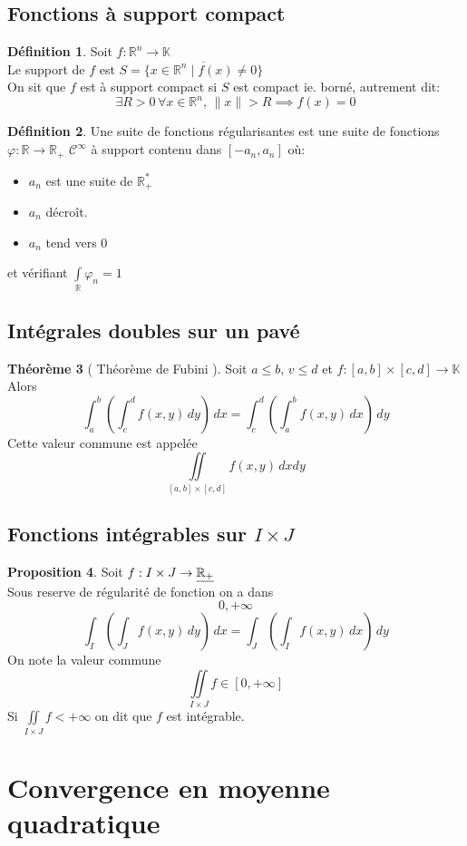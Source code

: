 \documentclass[10pt,a4paper]{article}
\theoremstyle{definition}
\newtheorem{proposition}{Proposition}[section]
\newtheorem{theorem}[proposition]{Théorème}
\newtheorem{definition}[proposition]{Définition}
\begin{document}
\subsection{Fonctions à support compact}
\begin{definition}
    Soit \(f: \mathbb{R}^n \to \mathbb{K}\) \\
    Le support de \(f\) est \(S = \overline{\{ x \in \mathbb{R}^n \mid f(x) \neq 0\}}\) \\
    On sit que \(f\) est à support compact si \(S\) est compact ie. borné, autrement dit:
    \[\exists R > 0 \, \forall x \in \mathbb{R}^n,\, \lVert x\rVert > R \implies f(x) = 0\]
\end{definition}
\begin{definition}
    Une suite de fonctions régularisantes est une suite de fonctions \\
    \(\varphi: \mathbb{R} \to \mathbb{R}_+\) \(\mathcal{C}^{\infty}\) à support contenu dans \([-a_n, a_n]\) où:
    \begin{itemize}
        \item \(a_n\) est une suite de \(\mathbb{R}_+^*\)
        \item \(a_n\) décroît.
        \item \(a_n\) tend vers \(0\)
    \end{itemize}
    et vérifiant \(\int\limits_{\mathbb{R}} \varphi_n = 1\)
\end{definition}

\subsection{Intégrales doubles sur un pavé}
\begin{theorem}[ Théorème de Fubini ]
    Soit \(a \leq b,\, v \leq d\) et \(f:[a, b] \times [c, d] \to \mathbb{K}\) \\
    Alors
    \[\int_{a}^{b} \left(\int_{c}^{d} f(x, y) \,dy\right) \,dx = \int_{c}^{d} \left(\int_{a}^{b} f(x, y) \,dx\right) \,dy\]
    Cette valeur commune est appelée
    \[\iint\limits_{[a, b] \times [c, d]}f(x, y) \, dx dy\]
\end{theorem}

\subsection{Fonctions intégrables sur \(I \times J\)}
\begin{proposition}
    Soit \(f: I \times J \to \uline{\mathbb{R}_+}\) \\
    Sous reserve de régularité de fonction on a dans \[0, +\infty\]
    \[\int_{I} \left(\int_{J} f(x, y) \,dy\right) \,dx = \int_{J} \left(\int_{I} f(x, y) \,dx\right) \,dy\]
    On note la valeur commune
    \[\iint\limits_{I \times J} f \in [0, +\infty]\]
    Si \(\iint\limits_{I \times J} f < +\infty\) on dit que \(f\) est intégrable.
\end{proposition}

\section{Convergence en moyenne quadratique}
\end{document}
